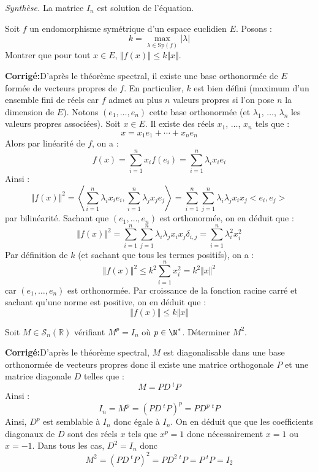 \documentclass[a4paper,twoside,french,11pt]{VcCours}
\newcommand{\corr}{\textbf{Corrigé:}}
\begin{document}
\textit{Synthèse.} La matrice $I_n$ est solution de l'équation.


\begin{Exercice}{} Soit $f$ un endomorphisme symétrique d'un espace euclidien $E$. Posons :
  \[
  k = \max_{\lambda \in \textrm{Sp}(f)} \vert \lambda \vert
  \]
Montrer que pour tout $x \in E$, $\Vert f(x) \Vert \leq k \Vert x \Vert$.
\end{Exercice}

\corr D'après le théorème spectral, il existe une base orthonormée de $E$ formée de vecteurs propres de $f$. En particulier, $k$ est bien défini (maximum d'un ensemble fini de réels car $f$ admet au plus $n$ valeurs propres si l'on pose $n$ la dimension de $E$). Notons $(e_1, \ldots, e_n)$ cette base orthonormée (et $\lambda_1$, $\ldots$, $\lambda_n$ les valeurs propres associées). Soit $x \in E$. Il existe des réels $x_1$, $\ldots$, $x_n$ tels que :
$$ x=  x_1 e_1 + \cdots +  x_n e_n$$ 
Alors par linéarité de $f$, on a :
$$ f(x) = \sum_{i=1}^n x_i f(e_i) = \sum_{i=1}^n \lambda_i x_i e_i$$
Ainsi :
$$ \Vert f(x) \Vert^2 = \left<\sum_{i=1}^n \lambda_i x_i e_i, \sum_{i=1}^n \lambda_j x_j e_j \right> = \sum_{i=1}^n \sum_{j=1}^n \lambda_i \lambda_j x_i x_j <e_i, e_j>$$
par bilinéarité. Sachant que $(e_1, \ldots, e_n)$ est orthonormée, on en déduit que :
$$ \Vert f(x) \Vert^2 = \sum_{i=1}^n \sum_{j=1}^n \lambda_i \lambda_j x_i x_j \delta_{i,j} = \sum_{i=1}^n \lambda_i^2 x_i^2 $$
Par définition de $k$ (et sachant que tous les termes positifs), on a :
$$  \Vert f(x) \Vert^2 \leq  k^2 \sum_{i=1}^n  x_i^2 = k^2 \Vert x\Vert^2$$
car $(e_1, \ldots, e_n)$ est orthonormée. Par croissance de la fonction racine carré et sachant qu'une norme est positive, on en déduit que :
$$ \Vert f(x) \Vert \leq k \Vert x \Vert$$


\begin{Exercice}{} Soit $M \in  \mathcal{S}_{n}(\mathbb{R})$ vérifiant $M^{p}= I_{n}$ où $p \in \N^{*}$. Déterminer $M^2$.
\end{Exercice}

\corr D'après le théorème spectral, $M$ est diagonalisable dans une base orthonormée de vecteurs propres donc il existe une matrice orthogonale $P$ et une matrice diagonale $D$ telles que :
$$ M = PD ~^tP$$
Ainsi :
$$ I_n= M^p = (PD ~^tP)^p = PD^p ~^tP$$
Ainsi, $D^p$ est semblable à $I_n$ donc égale à $I_n$. On en déduit que que les coefficients diagonaux  de $D$ sont des réels $x$ tels que $x^p=1$ donc nécessairement $x=1$ ou $x=-1$. Dans tous les cas, $D^2=I_n$ donc
$$ M^2= (PD ~^tP)^2 = PD^2 ~^tP = P~^tP= I_2$$
\end{document}
